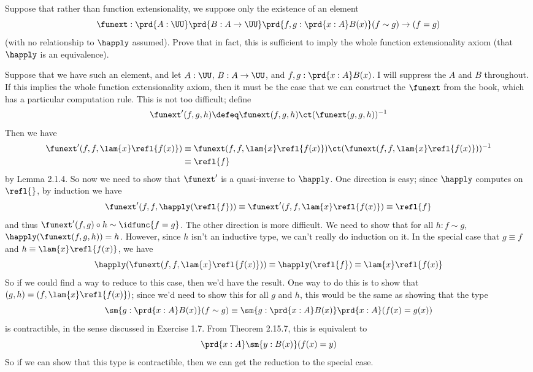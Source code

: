Suppose that rather than function extensionality, we suppose only the existence
of an element
\[
  \funext : \prd{A:\UU}\prd{B:A\to\UU}\prd{f, g : \prd{x:A}B(x)}
    (f \sim g) \to (f = g)
\]
(with no relationship to $\happly$ assumed).  Prove that in fact, this is
sufficient to imply the whole function extensionality axiom (that $\happly$ is
an equivalence).


 \soln
Suppose that we have such an element, and let $A:\UU$, $B:A \to \UU$, and $f, g
: \prd{x:A}B(x)$.  I will suppress the $A$ and $B$ throughout.  If this implies the whole function extensionality
axiom, then it must be the case that we can construct the $\funext$
from the book, which has a particular computation rule.  This is not
too difficult; define
\[
  \funext'(f, g, h) 
  \defeq 
  \funext(f, g, h) \ct (\funext(g, g, h))^{-1}
\]
Then we have
\begin{align*}
  \funext'(f, f, \lam{x}\refl{f(x)})
  &\equiv
  \funext(f, f, \lam{x}\refl{f(x)}) \ct (\funext(f, f,
  \lam{x}\refl{f(x)}))^{-1}
  \\&\equiv
  \refl{f}
\end{align*}
by Lemma 2.1.4.  So now we need to show that $\funext'$ is a quasi-inverse to
$\happly$.  One direction is easy; since $\happly$ computes on $\refl{}$, by
induction we have
\[
  \funext'(f, f, \happly(\refl{f}))
  \equiv
  \funext'(f, f, \lam{x}\refl{f(x)})
  \equiv
  \refl{f}
\]
and thus $\funext'(f, g) \circ h \sim \idfunc{f=g}$.  The other direction
is more difficult.  We need to show that for all $h : f \sim g$,
$\happly(\funext(f, g, h)) = h$.  However, since $h$ isn't an inductive type,
we can't really do induction on it.  In the special case that $g \equiv f$ and
$h \equiv \lam{x}\refl{f(x)}$, we have
\[
  \happly(\funext(f, f, \lam{x}\refl{f(x)}))
  \equiv
  \happly(\refl{f})
  \equiv
  \lam{x}\refl{f(x)}
\]
So if we could find a way to reduce to this case, then we'd have the result.
One way to do this is to show that $(g, h) = (f, \lam{x}\refl{f(x)})$; since
we'd need to show this for all $g$ and $h$, this would be the same as showing
that the type
\[
  \sm{g:\prd{x:A}B(x)}(f \sim g)
  \equiv
  \sm{g:\prd{x:A}B(x)}\prd{x:A}(f(x) = g(x))
\]
is contractible, in the sense discussed in Exercise 1.7.  From Theorem 2.15.7,
this is equivalent to
\[
  \prd{x:A}\sm{y:B(x)} (f(x) = y)
\]
So if we can show that this type is contractible, then we can get the reduction
to the special case.


